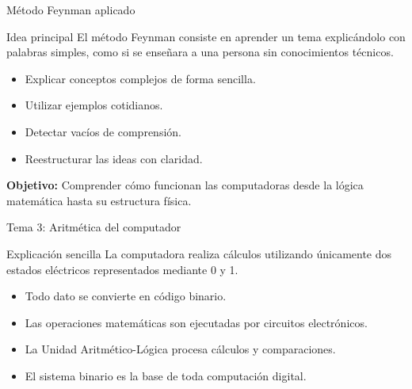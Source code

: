 \documentclass[10pt,aspectratio=169]{beamer}
\begin{document}
	\begin{frame}{Método Feynman aplicado}
		
		\begin{block}{Idea principal}
			El método Feynman consiste en aprender un tema explicándolo con palabras simples, como si se enseñara a una persona sin conocimientos técnicos.
		\end{block}
		
		\begin{itemize}
			\item Explicar conceptos complejos de forma sencilla.
			\item Utilizar ejemplos cotidianos.
			\item Detectar vacíos de comprensión.
			\item Reestructurar las ideas con claridad.
		\end{itemize}
		
		\vspace{0.3cm}
		
		\textbf{Objetivo:}
		Comprender cómo funcionan las computadoras desde la lógica matemática hasta su estructura física.
		
	\end{frame}
	
	
	\begin{frame}{Tema 3: Aritmética del computador}
		
		\begin{block}{Explicación sencilla}
			La computadora realiza cálculos utilizando únicamente dos estados eléctricos representados mediante 0 y 1.
		\end{block}
		
		\begin{itemize}
			\item Todo dato se convierte en código binario.
			\item Las operaciones matemáticas son ejecutadas por circuitos electrónicos.
			\item La Unidad Aritmético-Lógica procesa cálculos y comparaciones.
			\item El sistema binario es la base de toda computación digital.
		\end{itemize}
		
	\end{frame}
	
	
\end{document}

